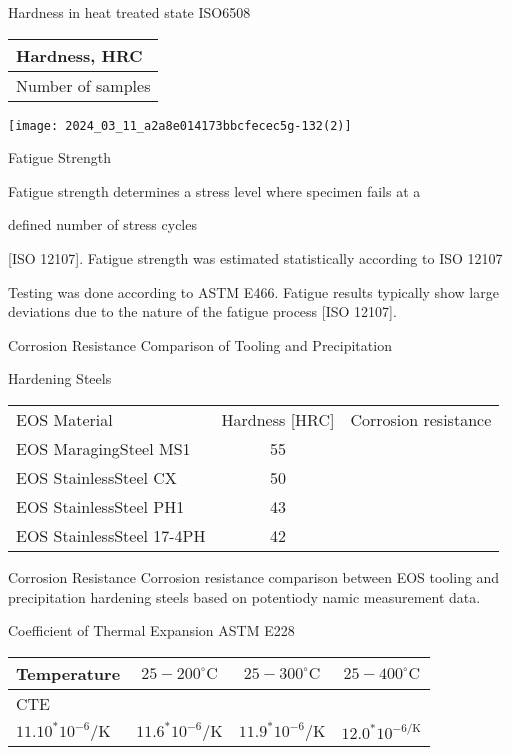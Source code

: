 \documentclass[10pt]{article}
\begin{document}
Hardness in heat treated state ISO6508

\begin{center}
\begin{tabular}{l}
\hline
Hardness, HRC \\
\hline
Number of samples \\
\hline
\end{tabular}
\end{center}

\begin{center}
\texttt{[image: 2024\_03\_11\_a2a8e014173bbcfecec5g-132(2)]}
\end{center}

Fatigue Strength

Fatigue strength determines a stress level where specimen fails at a

defined number of stress cycles

[ISO 12107]. Fatigue strength was estimated statistically according to ISO 12107

Testing was done according to ASTM E466. Fatigue results typically show large deviations due to the nature of the fatigue process [ISO 12107].

Corrosion Resistance Comparison of Tooling and Precipitation

Hardening Steels

\begin{center}
\begin{tabular}{lcc}
\hline
EOS Material & Hardness [HRC] & Corrosion resistance \\
\cline { 1 - 3 }
EOS MaragingSteel MS1 & 55 &  \\
\hline
EOS StainlessSteel CX & 50 &  \\
\hline
EOS StainlessSteel PH1 & 43 &  \\
\hline
EOS StainlessSteel 17-4PH & 42 &  \\
\hline
\end{tabular}
\end{center}

Corrosion Resistance Corrosion resistance comparison between EOS tooling and precipitation hardening steels based on potentiody namic measurement data.

Coefficient of Thermal Expansion ASTM E228

\begin{center}
\begin{tabular}{lccc}
\hline
Temperature & $25-200^{\circ} \mathrm{C}$ & $25-300^{\circ} \mathrm{C}$ & $25-400^{\circ} \mathrm{C}$ \\
\hline
CTE &  &  &  \\
\hline
$11.10^{*} 10^{-6} / \mathrm{K}$ & $11.6^{*} 10^{-6} / \mathrm{K}$ & $11.9^{*} 10^{-6} / \mathrm{K}$ & $12.0^{*} 10^{-6 / \mathrm{K}}$ \\
\hline
\end{tabular}
\end{center}
\end{document}
